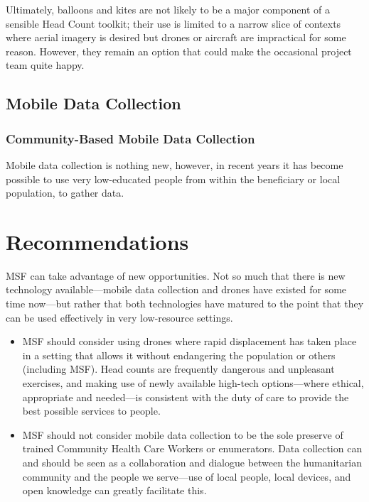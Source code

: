 \documentclass[a4paper,12pt,twoside]{article}
\begin{document}
Ultimately, balloons and kites are not likely to be a major component of a sensible Head Count toolkit; their use is limited to a narrow slice of contexts where aerial imagery is desired but drones or aircraft are impractical for some reason. However, they remain an option that could make the occasional project team quite happy.

\subsection{Mobile Data Collection}

\subsubsection{Community-Based Mobile Data Collection}
Mobile data collection is nothing new, however, in recent years it has become possible to use very low-educated people from within the beneficiary or local population, to gather data. 

\section{Recommendations}
MSF can take advantage of new opportunities. Not so much that there is new technology available---mobile data collection and drones have existed for some time now---but rather that both technologies have matured to the point that they can be used effectively in very low-resource settings.

\begin{itemize}
    \item MSF should consider using drones where rapid displacement has taken place in a setting that allows it without endangering the population or others (including MSF). Head counts are frequently dangerous and unpleasant exercises, and making use of newly available high-tech options---where ethical, appropriate and needed---is consistent with the duty of care to provide the best possible services to people.
    \item MSF should not consider mobile data collection to be the sole preserve of trained Community Health Care Workers or enumerators. Data collection can and should be seen as a collaboration and dialogue between the humanitarian community and the people we serve---use of local people, local devices, and open knowledge can greatly facilitate this. 
    
\end{itemize}
\end{document}
